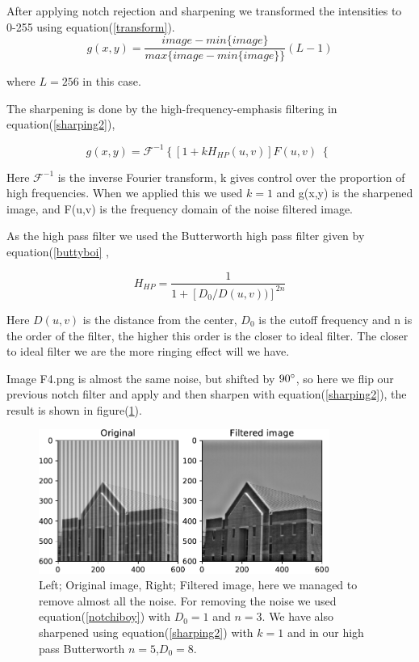 {    After applying notch rejection and sharpening we transformed the intensities to 0-255 using equation(\ref{transform}).
\begin{equation}
    g(x,y) = \frac{image-min\{image\}}{max\{image-min\{image\}\}}(L-1)
    \label{transform}
\end{equation}

where $L = 256$ in this case.

The sharpening is done by the high-frequency-emphasis filtering in equation(\ref{sharping2}),

\begin{equation}
    g(x,y) = \mathcal{F}^{-1}\left\lbrace[1 + kH_{HP}(u,v)]F(u,v) \right\lbrace
    \label{sharping2}
\end{equation}

Here $\mathcal{F}^{-1}$ is the inverse Fourier transform, k gives control over the proportion of high frequencies. When we applied this we used $k = 1$ and g(x,y) is the sharpened image, and F(u,v) is the frequency domain of the noise filtered image.


As the high pass filter we used the Butterworth high pass filter given by equation(\ref{buttyboi} ,

\begin{equation}
   H_{HP} = \frac{1}{1+[D_{0}/D(u,v))]^{2n}}
    \label{buttyboi}
\end{equation}

Here $D(u,v)$ is the distance from the center, $D_{0}$ is the cutoff frequency and n is the order of the filter, the higher this order is the closer to ideal filter. The closer to ideal filter we are the more ringing effect will we have.


Image F4.png is almost the same noise, but shifted by $90\degree$, so here we flip our previous notch filter and apply and then sharpen with equation(\ref{sharping2}), the result is shown in figure(\ref{C7F4}).

\begin{figure}[!htb]
    {\centering
        \includegraphics[width=0.85\textwidth]{C7F4.pdf}
        \caption{Left; Original image, Right; Filtered image, here we managed to remove almost all the noise. For removing the noise we used equation(\ref{notchiboy}) with $D_{0} = 1$ and $n = 3$. We have also sharpened using equation(\ref{sharping2}) with $k = 1$ and in our high pass Butterworth $n = 5$,$D_{0} = 8$.}
        \label{C7F4}
    \par}
    \end{figure}

}
